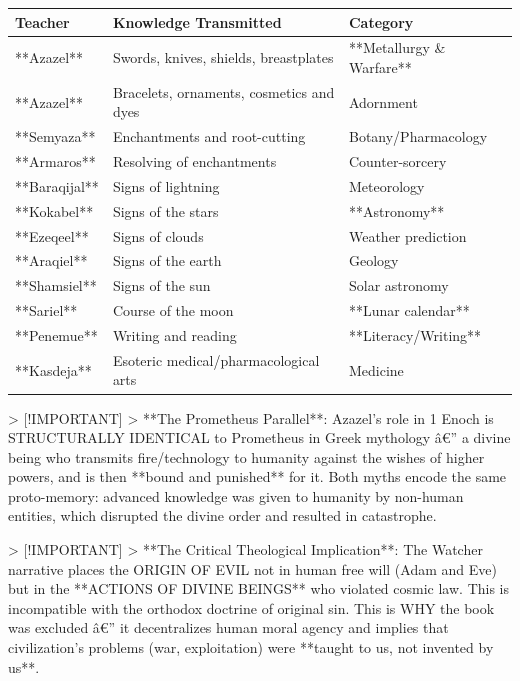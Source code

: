 \documentclass[aps,prd,11pt,onecolumn,superscriptaddress,nofootinbib,floatfix]{revtex4-2}
\begin{document}
\begin{table}[h!]
\centering
\begin{tabular}{p{3cm}p{3cm}p{3cm}}
\hline
Teacher & Knowledge Transmitted & Category \\
\hline
**Azazel** & Swords, knives, shields, breastplates & **Metallurgy \& Warfare** \\
**Azazel** & Bracelets, ornaments, cosmetics and dyes & Adornment \\
**Semyaza** & Enchantments and root-cutting & Botany/Pharmacology \\
**Armaros** & Resolving of enchantments & Counter-sorcery \\
**Baraqijal** & Signs of lightning & Meteorology \\
**Kokabel** & Signs of the stars & **Astronomy** \\
**Ezeqeel** & Signs of clouds & Weather prediction \\
**Araqiel** & Signs of the earth & Geology \\
**Shamsiel** & Signs of the sun & Solar astronomy \\
**Sariel** & Course of the moon & **Lunar calendar** \\
**Penemue** & Writing and reading & **Literacy/Writing** \\
**Kasdeja** & Esoteric medical/pharmacological arts & Medicine \\
\hline
\end{tabular}
\end{table}



> [!IMPORTANT]
> **The Prometheus Parallel**: Azazel's role in 1 Enoch is STRUCTURALLY IDENTICAL to Prometheus in Greek mythology â€'' a divine being who transmits fire/technology to humanity against the wishes of higher powers, and is then **bound and punished** for it. Both myths encode the same proto-memory: advanced knowledge was given to humanity by non-human entities, which disrupted the divine order and resulted in catastrophe.


> [!IMPORTANT]
> **The Critical Theological Implication**: The Watcher narrative places the ORIGIN OF EVIL not in human free will (Adam and Eve) but in the **ACTIONS OF DIVINE BEINGS** who violated cosmic law. This is incompatible with the orthodox doctrine of original sin. This is WHY the book was excluded â€'' it decentralizes human moral agency and implies that civilization's problems (war, exploitation) were **taught to us, not invented by us**.
\end{document}
